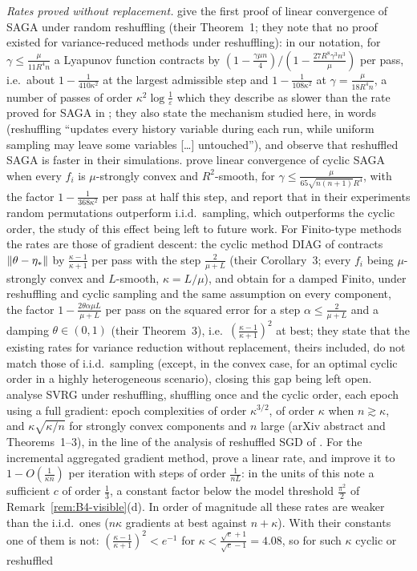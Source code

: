 \emph{Rates proved without replacement.} \cite{ying2017variance} give the first proof of linear convergence of SAGA under random reshuffling (their Theorem~1; they note that no proof existed for variance-reduced methods under reshuffling): in our notation, for $\gamma\le\frac{\mu}{11R^4n}$ a Lyapunov function contracts by $(1-\frac{\gamma\mu n}4)/(1-\frac{27R^8\gamma^3n^3}{\mu})$ per pass, i.e.\ about $1-\frac1{410\kappa^2}$ at the largest admissible step and $1-\frac1{108\kappa^2}$ at $\gamma=\frac\mu{18R^4n}$, a number of passes of order $\kappa^2\log\frac1\varepsilon$ which they describe as slower than the rate proved for SAGA in \cite{defazio2014saga}; they also state the mechanism studied here, in words (reshuffling ``updates every history variable during each run, while uniform sampling may leave some variables [\dots] untouched''), and observe that reshuffled SAGA is faster in their simulations. \cite{park2020linear} prove linear convergence of cyclic SAGA when every $f_i$ is $\mu$-strongly convex and $R^2$-smooth, for $\gamma\le\frac{\mu}{65\sqrt{n(n+1)}R^4}$, with the factor $1-\frac1{368\kappa^2}$ per pass at half this step, and report that in their experiments random permutations outperform i.i.d.\ sampling, which outperforms the cyclic order, the study of this effect being left to future work. For Finito-type methods the rates are those of gradient descent: the cyclic method DIAG of \cite{mokhtari2018surpassing} contracts $\left\|\theta-\eta_\ast\right\|$ by $\frac{\kappa-1}{\kappa+1}$ per pass with the step $\frac2{\mu+L}$ (their Corollary~3; every $f_i$ being $\mu$-strongly convex and $L$-smooth, $\kappa=L/\mu$), and \cite{huang2021improved} obtain for a damped Finito, under reshuffling and cyclic sampling and the same assumption on every component, the factor $1-\frac{2\theta\alpha\mu L}{\mu+L}$ per pass on the squared error for a step $\alpha\le\frac2{\mu+L}$ and a damping $\theta\in(0,1)$ (their Theorem~3), i.e.\ $(\frac{\kappa-1}{\kappa+1})^2$ at best; they state that the existing rates for variance reduction without replacement, theirs included, do not match those of i.i.d.\ sampling (except, in the convex case, for an optimal cyclic order in a highly heterogeneous scenario), closing this gap being left open. \cite{malinovsky2023random} analyse SVRG under reshuffling, shuffling once and the cyclic order, each epoch using a full gradient: epoch complexities of order $\kappa^{3/2}$, of order $\kappa$ when $n\gtrsim\kappa$, and $\kappa\sqrt{\kappa/n}$ for strongly convex components and $n$ large (arXiv abstract and Theorems~1--3), in the line of the analysis of reshuffled SGD of \cite{mishchenko2020random}. For the incremental aggregated gradient method, \cite{gurbuzbalaban2017convergence} prove a linear rate, and \cite{vanli2016stronger} improve it to $1-O(\frac1{\kappa n})$ per iteration with steps of order $\frac1{nL}$: in the units of this note a sufficient $c$ of order $\frac13$, a constant factor below the model threshold $\frac{\pi^2}2$ of Remark~\ref{rem:B4-visible}(d). In order of magnitude all these rates are weaker than the i.i.d.\ ones ($n\kappa$ gradients at best against $n+\kappa$). With their constants one of them is not: $(\frac{\kappa-1}{\kappa+1})^2<e^{-1}$ for $\kappa<\frac{\sqrt e+1}{\sqrt e-1}=4.08$, so for such $\kappa$ cyclic or reshuffled 